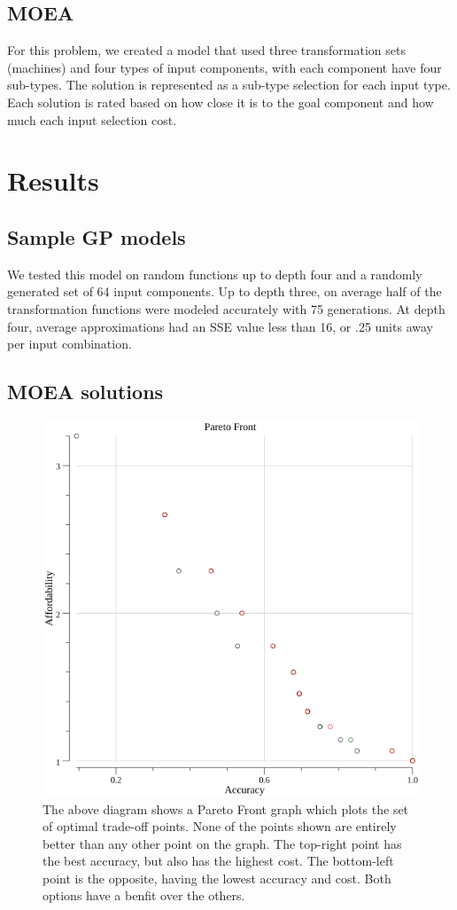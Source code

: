 \documentclass{IEEEtran}
\begin{document}
\subsection{MOEA}
For this problem, we created a model that used three transformation sets (machines) and four types of input components, with each component have four sub-types. The solution is represented as a sub-type selection for each input type. Each solution is rated based on how close it is to the goal component and how much each input selection cost.

\section{Results}
\subsection{Sample GP models}
We tested this model on random functions up to depth four and a randomly generated set of 64 input components. Up to depth three, on average half of the transformation functions were modeled accurately with 75 generations. At depth four, average approximations had an SSE value less than 16, or .25 units away per input combination.

\subsection{MOEA solutions}
\begin{figure}[!t]
\centerline{\includegraphics[width=\columnwidth]{points.png}}
\caption{The above diagram shows a Pareto Front graph which plots the set of optimal trade-off points. None of the points shown are entirely better than any other point on the graph. The top-right point has the best accuracy, but also has the highest cost. The bottom-left point is the opposite, having the lowest accuracy and cost. Both options have a benfit over the others.}
\end{figure}
\end{document}
